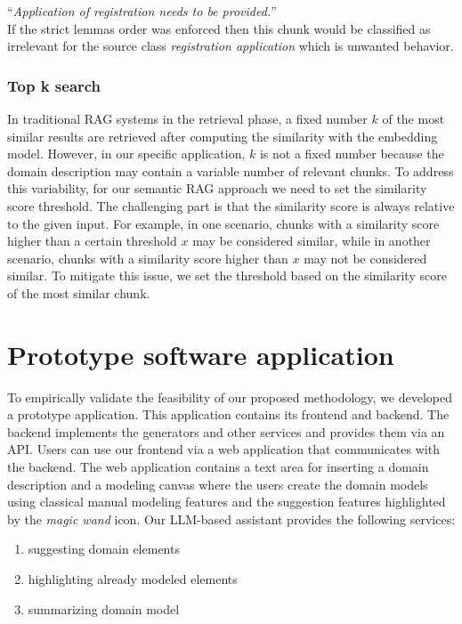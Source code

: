 \noindent{}``\textit{Application of registration needs to be provided.}'' \\

\noindent{}If the strict lemmas order was enforced then this chunk would be classified as irrelevant for the source class \textit{registration application} which is unwanted behavior.


\subsubsection{Top k search}
\label{sec:top_k_search}

In traditional RAG systems in the retrieval phase, a fixed number $k$ of the most similar results are retrieved after computing the similarity with the embedding model. However, in our specific application, $k$ is not a fixed number because the domain description may contain a variable number of relevant chunks. To address this variability, for our semantic RAG approach we need to set the similarity score threshold. The challenging part is that the similarity score is always relative to the given input. For example, in one scenario, chunks with a similarity score higher than a certain threshold $x$ may be considered similar, while in another scenario, chunks with a similarity score higher than $x$ may not be considered similar. To mitigate this issue, we set the threshold based on the similarity score of the most similar chunk.


\section{Prototype software application}

To empirically validate the feasibility of our proposed methodology, we developed a prototype application. This application contains its frontend and backend. The backend implements the generators and other services and provides them via an API. Users can use our frontend via a web application that communicates with the backend. The web application contains a text area for inserting a domain description and a modeling canvas where the users create the domain models using classical manual modeling features and the suggestion features highlighted by the \textit{magic wand} icon. Our LLM-based assistant provides the following services:

\begin{enumerate}
\item suggesting domain elements
\item highlighting already modeled elements
\item summarizing domain model
\end{enumerate}


